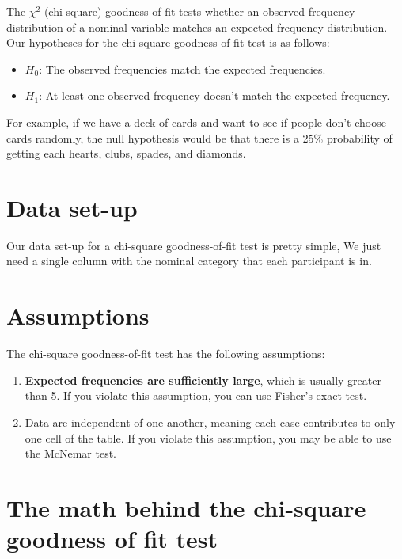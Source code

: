 \documentclass[
]{book}
\begin{document}
The \(\chi^2\) (chi-square) goodness-of-fit tests whether an observed frequency distribution of a nominal variable matches an expected frequency distribution. Our hypotheses for the chi-square goodness-of-fit test is as follows:

\begin{itemize}
\item
  \(H_0\): The observed frequencies match the expected frequencies.
\item
  \(H_1\): At least one observed frequency doesn't match the expected frequency.
\end{itemize}

For example, if we have a deck of cards and want to see if people don't choose cards randomly, the null hypothesis would be that there is a 25\% probability of getting each hearts, clubs, spades, and diamonds.

\hypertarget{data-set-up-2}{%
\section{Data set-up}\label{data-set-up-2}}

Our data set-up for a chi-square goodness-of-fit test is pretty simple, We just need a single column with the nominal category that each participant is in.

\hypertarget{assumptions-1}{%
\section{Assumptions}\label{assumptions-1}}

The chi-square goodness-of-fit test has the following assumptions:

\begin{enumerate}
\def\labelenumi{\arabic{enumi}.}
\item
  \textbf{Expected frequencies are sufficiently large}, which is usually greater than 5. If you violate this assumption, you can use Fisher's exact test.
\item
  Data are independent of one another, meaning each case contributes to only one cell of the table. If you violate this assumption, you may be able to use the McNemar test.
\end{enumerate}

\hypertarget{the-math-behind-the-chi-square-goodness-of-fit-test}{%
\section{The math behind the chi-square goodness of fit test}\label{the-math-behind-the-chi-square-goodness-of-fit-test}}
\end{document}
